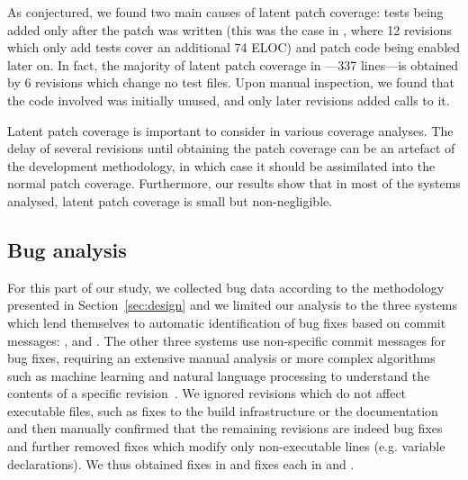 As conjectured, we found two main causes of latent patch coverage:
tests being added only after the patch was written (this was the case
in \lighttpdtwo, where 12 revisions which only add tests cover an
additional 74 ELOC) and patch code being enabled later on. In fact,
the majority of latent patch coverage in \lighttpdtwo---337 lines---is
obtained by 6 revisions which change no test files.  Upon manual
inspection, we found that the code involved was initially unused, and
only later revisions added calls to it.

Latent patch coverage is important to consider in various coverage
analyses. The delay of several revisions until obtaining the patch
coverage can be an artefact of the development methodology, in which
case it should be assimilated into the normal patch coverage. Furthermore,
our results show that in most of the systems analysed, latent patch
coverage is small but non-negligible.

\subsection{Bug analysis}
\label{sec:bugs}



For this part of our study, we collected bug data according to the
methodology presented in Section~\ref{sec:design} and we limited our
analysis to the three systems which lend themselves to automatic
identification of bug fixes based on commit messages:
\memcached, \redis and \zeromq.  The other three systems
use non-specific commit messages for bug fixes, requiring an extensive
manual analysis or more complex algorithms such as machine learning
and natural language processing to understand the contents of a
specific revision~\cite{categorization:esem10}.  We ignored revisions
which do not affect executable files, such as fixes to the build
infrastructure or the documentation and then manually confirmed
that the remaining revisions are indeed bug
fixes~\cite{bug-feature:icse13} and further removed fixes which modify
only non-executable lines (e.g. variable declarations). We thus
obtained \memcachedFixes fixes in \memcached and \redisFixes fixes each in \redis
and \zeromq. %

